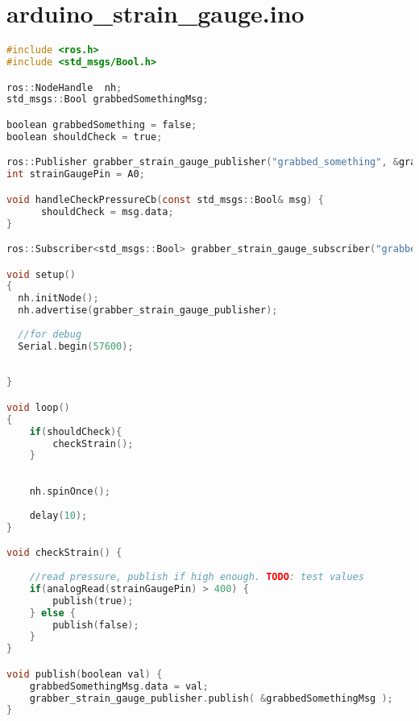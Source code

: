 \section{arduino\_strain\_gauge.ino}\label{sec:StrainGauge}
\begin{lstlisting}[language=C]
#include <ros.h>
#include <std_msgs/Bool.h>

ros::NodeHandle  nh;
std_msgs::Bool grabbedSomethingMsg;

boolean grabbedSomething = false;
boolean shouldCheck = true;

ros::Publisher grabber_strain_gauge_publisher("grabbed_something", &grabbedSomethingMsg);
int strainGaugePin = A0;

void handleCheckPressureCb(const std_msgs::Bool& msg) {  
      shouldCheck = msg.data;
}

ros::Subscriber<std_msgs::Bool> grabber_strain_gauge_subscriber("grabber_check_pressure", &handleCheckPressureCb);

void setup()
{
  nh.initNode();
  nh.advertise(grabber_strain_gauge_publisher);
  
  //for debug
  Serial.begin(57600);
  
  
}

void loop()
{
    if(shouldCheck){
        checkStrain();
    }
    
    
    nh.spinOnce();
  
    delay(10);
}

void checkStrain() {
  
    //read pressure, publish if high enough. TODO: test values
    if(analogRead(strainGaugePin) > 400) {
        publish(true);
    } else {
        publish(false);
    }
}

void publish(boolean val) {
    grabbedSomethingMsg.data = val;
    grabber_strain_gauge_publisher.publish( &grabbedSomethingMsg );
}
\end{lstlisting}